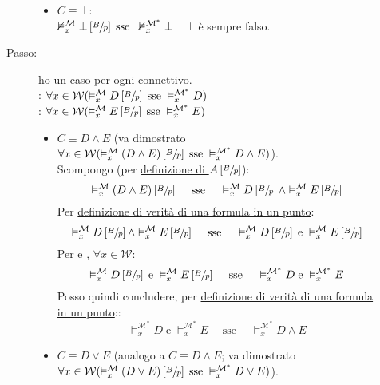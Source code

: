 \documentclass[a4paper,12pt]{article}
\newcommand{\latinmath}[1]{\text{\latinmodern{#1}}} %
\begin{document}
\begin{description}
\begin{dimo}
\begin{dimo}
\begin{description}
\begin{itemize}
					\item $C \equiv \bot$: \\
					$\nvDash_x^{\mathcal{M}} \bot \left[\sfrac{B}{p}\right] \; \text{sse} \;\; \nvDash_x^{\mathcal{M^{\ast}}} \bot$ \qquad \qquad \quad $\; \; \, \bot$ è sempre falso.
				\end{itemize}
				\item[Passo:] ho un caso per ogni connettivo.\\
				\latinmath{IH1}: \emph{$\forall x \in \mathcal{W} (\vDash_x^{\mathcal{M}} D\left[\sfrac{B}{p}\right] \; \text{sse} \; \vDash_x^{\mathcal{M^{\ast}}} D)$} \\
				\latinmath{IH2}: \emph{$\forall x \in \mathcal{W} (\vDash_x^{\mathcal{M}} E\left[\sfrac{B}{p}\right] \; \text{sse} \; \vDash_x^{\mathcal{M^{\ast}}} E)$}
				\begin{itemize}
					\item $C \equiv D \land E$ (va dimostrato \emph{$\forall x \in \mathcal{W} (\vDash_x^{\mathcal{M}} (D \land E)\left[\sfrac{B}{p}\right] \; \text{sse} \; \vDash_x^{\mathcal{M^{\ast}}} D \land E)$}). \\
					Scompongo (per \hyperlink{defsu}{definizione di $A \left[\sfrac{B}{p}\right]$}):
					$$\vDash_x^{\mathcal{M}} (D \land E)\left[\sfrac{B}{p}\right] \quad\; \text{sse} \quad\; \vDash_x^{\mathcal{M}} D\left[\sfrac{B}{p}\right] \land \vDash_x^{\mathcal{M}} E\left[\sfrac{B}{p}\right]$$
					Per \hyperlink{defverp}{definizione di verità di una formula in un punto}:
					$$\vDash_x^{\mathcal{M}} D\left[\sfrac{B}{p}\right] \land \vDash_x^{\mathcal{M}} E\left[\sfrac{B}{p}\right] \quad\; \text{sse} \quad\; \vDash_x^{\mathcal{M}} D\left[\sfrac{B}{p}\right] \; \text{e} \; \vDash_x^{\mathcal{M}} E\left[\sfrac{B}{p}\right]$$
					Per \latinmath{IH1} e \latinmath{IH2}, $\forall x \in \mathcal{W}$:
					$$\vDash_x^{\mathcal{M}} D\left[\sfrac{B}{p}\right] \; \text{e} \; \vDash_x^{\mathcal{M}} E\left[\sfrac{B}{p}\right] \quad\; \text{sse} \quad\; \vDash_x^{\mathcal{M^{\ast}}} D \; \text{e} \; \vDash_x^{\mathcal{M^{\ast}}} E$$
					Posso quindi concludere, per \hyperlink{defverp}{definizione di verità di una formula in un punto}::
					$$\vDash_x^{\mathcal{M^{\ast}}} D \; \text{e} \; \vDash_x^{\mathcal{M^{\ast}}} E \quad\; \text{sse} \quad\; \vDash_x^{\mathcal{M^{\ast}}} D \land E$$
					\item $C \equiv D \lor E$ (analogo a $C \equiv D \land E$; va dimostrato \emph{$\forall x \in \mathcal{W} (\vDash_x^{\mathcal{M}} (D \lor E)\left[\sfrac{B}{p}\right] \; \text{sse} \; \vDash_x^{\mathcal{M^{\ast}}} D \lor E)$}). \\

\end{itemize}
\end{description}
\end{dimo}
\end{dimo}
\end{description}
\end{document}

